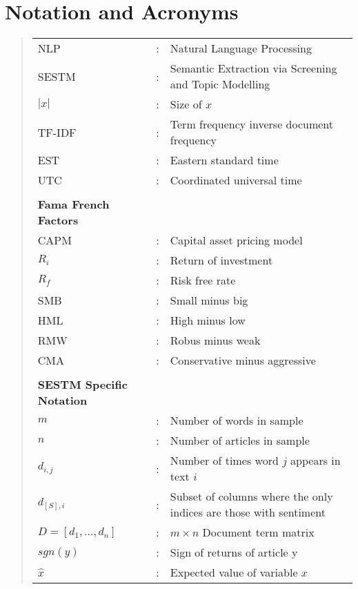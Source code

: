 \documentclass[ oneside,%
                    author={Joshua Felmeden},
                    degree={MEng},
                     title={Sentiment Analysis of Financial Headlines Based on Realised Stock Returns},
                  subtitle={Research}]{dissertation}
\begin{document}

\chapter*{Notation and Acronyms}

\begin{quote}
\noindent
\begin{tabular}{lcl}
NLP               &:    &     Natural Language Processing \\
SESTM             &:    &     Semantic Extraction via Screening and Topic Modelling \\
$|x|$             &:    &     Size of $x$ \\
TF-IDF            &:    &     Term frequency inverse document frequency\\
EST               &:    &     Eastern standard time\\
UTC               &:    &     Coordinated universal time\\
\\
\textbf{Fama French Factors} \\
CAPM              &:    &     Capital asset pricing model\\
$R_i$             &:    &     Return of investment\\
$R_f$             &:    &     Risk free rate\\
SMB               &:    &     Small minus big\\
HML               &:    &     High minus low\\    
RMW               &:    &     Robus minus weak\\
CMA               &:    &     Conservative minus aggressive\\
\\
\textbf{SESTM Specific Notation} \\
$m$               &:    &     Number of words in sample \\
$n$               &:    &     Number of articles in sample \\
$d_{i,j}$         &:    &     Number of times word $j$ appears in text $i$ \\
$d_{[S],i}$       &:    &     Subset of columns where the only indices are those with sentiment \\
$D = [d_1, \dots, d_n]$ &:    & $m \times n$ Document term matrix \\
$sgn(y)$          &:    &     Sign of returns of article y \\
$\hat x$          &:    &    Expected value of variable $x$ \\
\end{tabular}
\end{quote}
\end{document}
